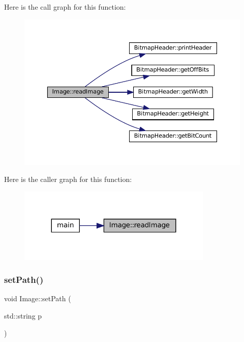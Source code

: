 Here is the call graph for this function\+:
\nopagebreak
\begin{figure}[H]
\begin{center}
\leavevmode
\includegraphics[width=350pt]{classImage_ac0aa1f41cb368d87b20dd38839218d93_cgraph}
\end{center}
\end{figure}
Here is the caller graph for this function\+:
\nopagebreak
\begin{figure}[H]
\begin{center}
\leavevmode
\includegraphics[width=263pt]{classImage_ac0aa1f41cb368d87b20dd38839218d93_icgraph}
\end{center}
\end{figure}
\mbox{\label{classImage_aabb8cec47c25c0e3a36ba2a455c2aa6c}} 
\subsubsection{\texorpdfstring{setPath()}{setPath()}}
{\footnotesize\ttfamily void Image\+::set\+Path (\begin{DoxyParamCaption}\item[{std\+::string}]{p }\end{DoxyParamCaption})}



